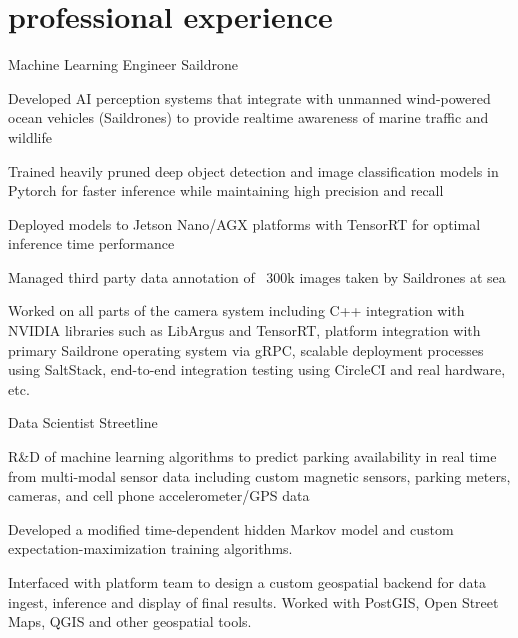 \documentclass[]{friggeri-cv} %
\let\tempone\itemize
\let\temptwo\enditemize
\renewenvironment{itemize}{\tempone\addtolength{\itemsep}{0.5em}}{\temptwo}
\begin{document}
\section{professional experience}
%
\begin{entrylist}
{Machine Learning Engineer}
{Saildrone}
{\vspace{-\baselineskip}
\begin{itemize}
\item Developed AI perception systems that integrate with unmanned wind-powered ocean vehicles (Saildrones) to provide realtime awareness of marine traffic and wildlife 
\item Trained heavily pruned deep object detection and image classification models in Pytorch for faster inference while maintaining high precision and recall
\item Deployed models to Jetson Nano/AGX platforms with TensorRT for optimal inference time performance
\item Managed third party data annotation of ~300k images taken by Saildrones at sea
\item Worked on all parts of the camera system including C++ integration with NVIDIA libraries such as LibArgus and TensorRT, platform integration with primary Saildrone operating system via gRPC, scalable deployment processes using SaltStack, end-to-end integration testing using CircleCI and real hardware, etc.
\end{itemize}
}
\smallskip
{}
{Data Scientist}
{Streetline}
{\vspace{-\baselineskip}
\begin{itemize}
\item R\&D of machine learning algorithms to predict parking availability in real time from multi-modal sensor data including custom magnetic sensors, parking meters, cameras, and cell phone accelerometer/GPS data
\item Developed a modified time-dependent hidden Markov model and custom expectation-maximization training algorithms.
\item Interfaced with platform team to design a custom geospatial backend for data ingest, inference and display of final results. Worked with PostGIS, Open Street Maps, QGIS and other geospatial tools.

\end{itemize}}
\end{entrylist}
\end{document}
